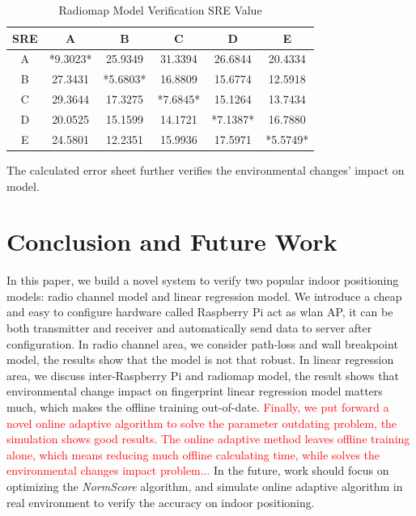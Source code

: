 \documentclass[10pt,conference]{IEEEtran}
\newcommand{\yc}[1]{\textcolor{red}{#1}}
\begin{document}
\begin{table}[!hbp]
\centering
\begin{tabular}{|c|c|c|c|c|c|}
    	\hline
	SRE & A & B & C & D & E \\
	\hline
	A & *9.3023* & 25.9349 & 31.3394 & 26.6844 & 20.4334 \\
    	\hline
	B & 27.3431 & *5.6803* & 16.8809 & 15.6774 & 12.5918 \\
    	\hline
	C & 29.3644 & 17.3275 & *7.6845* & 15.1264 & 13.7434 \\
	\hline
	D & 20.0525 & 15.1599 & 14.1721 & *7.1387* & 16.7880 \\
	\hline
	E & 24.5801 & 12.2351 & 15.9936 & 17.5971 & *5.5749* \\
	\hline
\end{tabular}
\caption{Radiomap Model Verification SRE Value}\label{radiomapModel}
\end{table}

The calculated error sheet further verifies the environmental changes' impact on model.

\section{Conclusion and Future Work}
In this paper, we build a novel system to verify two popular indoor positioning models: radio channel model and linear regression model. We introduce a cheap and easy to configure hardware called Raspberry Pi act as wlan AP, it can be both transmitter and receiver and automatically send data to server after configuration. In radio channel area, we consider path-loss and wall breakpoint model, the results show that the model is not that robust. In linear regression area, we discuss inter-Raspberry Pi and radiomap model, the result shows that environmental change impact on fingerprint linear regression model matters much, which makes the offline training out-of-date. \yc{Finally, we put forward a novel online adaptive algorithm to solve the parameter outdating problem, the simulation shows good results. The online adaptive method leaves offline training alone, which means reducing much offline calculating time, while solves the environmental changes impact problem... } In the future, work should focus on optimizing the \textit{NormScore} algorithm, and simulate online adaptive algorithm in real environment to verify the accuracy on indoor positioning.
\end{document}
